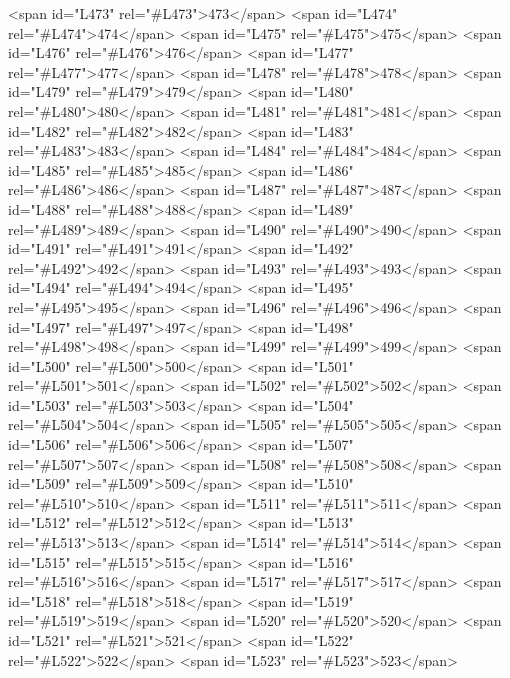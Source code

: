 <span id="L473" rel="#L473">473</span>
<span id="L474" rel="#L474">474</span>
<span id="L475" rel="#L475">475</span>
<span id="L476" rel="#L476">476</span>
<span id="L477" rel="#L477">477</span>
<span id="L478" rel="#L478">478</span>
<span id="L479" rel="#L479">479</span>
<span id="L480" rel="#L480">480</span>
<span id="L481" rel="#L481">481</span>
<span id="L482" rel="#L482">482</span>
<span id="L483" rel="#L483">483</span>
<span id="L484" rel="#L484">484</span>
<span id="L485" rel="#L485">485</span>
<span id="L486" rel="#L486">486</span>
<span id="L487" rel="#L487">487</span>
<span id="L488" rel="#L488">488</span>
<span id="L489" rel="#L489">489</span>
<span id="L490" rel="#L490">490</span>
<span id="L491" rel="#L491">491</span>
<span id="L492" rel="#L492">492</span>
<span id="L493" rel="#L493">493</span>
<span id="L494" rel="#L494">494</span>
<span id="L495" rel="#L495">495</span>
<span id="L496" rel="#L496">496</span>
<span id="L497" rel="#L497">497</span>
<span id="L498" rel="#L498">498</span>
<span id="L499" rel="#L499">499</span>
<span id="L500" rel="#L500">500</span>
<span id="L501" rel="#L501">501</span>
<span id="L502" rel="#L502">502</span>
<span id="L503" rel="#L503">503</span>
<span id="L504" rel="#L504">504</span>
<span id="L505" rel="#L505">505</span>
<span id="L506" rel="#L506">506</span>
<span id="L507" rel="#L507">507</span>
<span id="L508" rel="#L508">508</span>
<span id="L509" rel="#L509">509</span>
<span id="L510" rel="#L510">510</span>
<span id="L511" rel="#L511">511</span>
<span id="L512" rel="#L512">512</span>
<span id="L513" rel="#L513">513</span>
<span id="L514" rel="#L514">514</span>
<span id="L515" rel="#L515">515</span>
<span id="L516" rel="#L516">516</span>
<span id="L517" rel="#L517">517</span>
<span id="L518" rel="#L518">518</span>
<span id="L519" rel="#L519">519</span>
<span id="L520" rel="#L520">520</span>
<span id="L521" rel="#L521">521</span>
<span id="L522" rel="#L522">522</span>
<span id="L523" rel="#L523">523</span>

